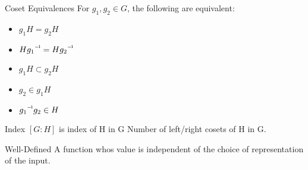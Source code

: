 \begin{flashcard}[Definition]{Coset Equivalences}
  For $g_1, g_2 \in G$, the following are equivalent:
  \begin{itemize}
    \item $g_1 H = g_2 H$
    \item $H \inv{g_1} = H \inv{g_2}$
    \item $g_1 H \subset g_2 H$
    \item $g_2 \in g_1 H$
    \item $\inv{g_1}g_2 \in H$
  \end{itemize}
\end{flashcard}

\begin{flashcard}[Definition]{Index}
  $[G : H]$ is index of H in G
  \vfill
  Number of left/right cosets of H in G.
\end{flashcard}

\begin{flashcard}[Definition]{Well-Defined}
  A function whos value is independent of the choice of representation of the input.
\end{flashcard}

